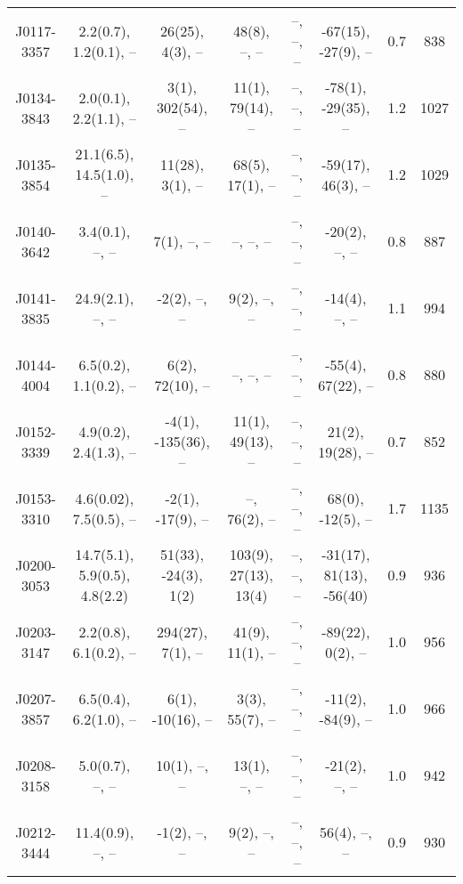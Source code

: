 \documentclass{mnras}
\begin{document}
\begin{table*}
\begin{tabular}{cccccccc}
J0117-3357 & 2.2(0.7), 1.2(0.1), -- & 26(25), 4(3), -- & 48(8), --, -- & --, --, -- & -67(15), -27(9), -- & 0.7 & 838 \\ 

J0134-3843 & 2.0(0.1), 2.2(1.1), -- & 3(1), 302(54), -- & 11(1), 79(14), -- & --, --, -- & -78(1), -29(35), -- & 1.2 & 1027 \\ 

J0135-3854 & 21.1(6.5), 14.5(1.0), -- & 11(28), 3(1), -- & 68(5), 17(1), -- & --, --, -- & -59(17), 46(3), -- & 1.2 & 1029 \\ 

J0140-3642 & 3.4(0.1), --, -- & 7(1), --, -- & --, --, -- & --, --, -- & -20(2), --, -- & 0.8 & 887 \\ 

J0141-3835 & 24.9(2.1), --, -- & -2(2), --, -- & 9(2), --, -- & --, --, -- & -14(4), --, -- & 1.1 & 994 \\ 

J0144-4004 & 6.5(0.2), 1.1(0.2), -- & 6(2), 72(10), -- & --, --, -- & --, --, -- & -55(4), 67(22), -- & 0.8 & 880 \\ 

J0152-3339 & 4.9(0.2), 2.4(1.3), -- & -4(1), -135(36), -- & 11(1), 49(13), -- & --, --, -- & 21(2), 19(28), -- & 0.7 & 852 \\ 

J0153-3310 & 4.6(0.02), 7.5(0.5), -- & -2(1), -17(9), -- & --, 76(2), -- & --, --, -- & 68(0), -12(5), -- & 1.7 & 1135 \\ 

J0200-3053 & 14.7(5.1), 5.9(0.5), 4.8(2.2) & 51(33), -24(3), 1(2) & 103(9), 27(13), 13(4) & --, --, -- & -31(17), 81(13), -56(40) & 0.9 & 936 \\ 

J0203-3147 & 2.2(0.8), 6.1(0.2), -- & 294(27), 7(1), -- & 41(9), 11(1), -- & --, --, -- & -89(22), 0(2), -- & 1.0 & 956 \\ 

J0207-3857 & 6.5(0.4), 6.2(1.0), -- & 6(1), -10(16), -- & 3(3), 55(7), -- & --, --, -- & -11(2), -84(9), -- & 1.0 & 966 \\ 

J0208-3158 & 5.0(0.7), --, -- & 10(1), --, -- & 13(1), --, -- & --, --, -- & -21(2), --, -- & 1.0 & 942 \\ 

J0212-3444 & 11.4(0.9), --, -- & -1(2), --, -- & 9(2), --, -- & --, --, -- & 56(4), --, -- & 0.9 & 930 \\ 


\end{tabular}
\end{table*}
\end{document}

